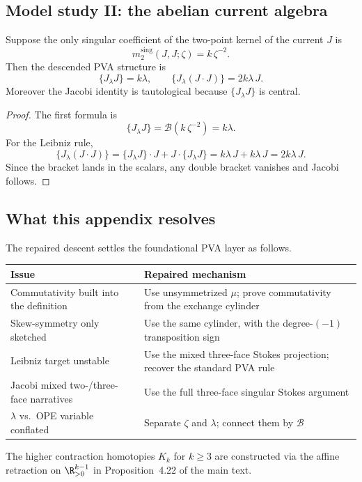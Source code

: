\subsection{Model study II: the abelian current algebra}

\begin{proposition}
\label{prop:abelian-study}
Suppose the only singular coefficient of the two-point kernel of the current $J$ is
\[
m_2^{\mathrm{sing}}(J,J;\zeta)=k\,\zeta^{-2}.
\]
Then the descended PVA structure is
\[
\{J_\lambda J\}=k\lambda,
\qquad
\{J_\lambda (J\cdot J)\}=2k\lambda\,J.
\]
Moreover the Jacobi identity is tautological because $\{J_\lambda J\}$ is central.
\end{proposition}

\begin{proof}
The first formula is
\[
\{J_\lambda J\}
=
\mathcal B(k\,\zeta^{-2})
=
k\lambda.
\]
For the Leibniz rule,
\[
\{J_\lambda(J\cdot J)\}
=
\{J_\lambda J\}\cdot J + J\cdot\{J_\lambda J\}
=
k\lambda\,J + k\lambda\,J
=
2k\lambda\,J.
\]
Since the bracket lands in the scalars, any double bracket vanishes and Jacobi follows.
\end{proof}

\subsection{What this appendix resolves}

\begin{summary}
\label{sum:pva-repair-ledger}
The repaired descent settles the foundational PVA layer as follows.

\begin{center}
\renewcommand{\arraystretch}{1.2}
\small
\begin{tabular}{@{}p{}|p{}@{}}
Issue & Repaired mechanism \\
\hline
Commutativity built into the definition & Use unsymmetrized $\mu$; prove commutativity from the exchange cylinder \\
Skew-symmetry only sketched & Use the same cylinder, with the degree-$(-1)$ transposition sign \\
Leibniz target unstable & Use the mixed three-face Stokes projection; recover the standard PVA rule \\
Jacobi mixed two-/three-face narratives & Use the full three-face singular Stokes argument \\
$\lambda$ vs.\ OPE variable conflated & Separate $\zeta$ and $\lambda$; connect them by $\mathcal B$
\end{tabular}
\end{center}

The higher contraction homotopies $K_k$ for $k\ge3$ are constructed via the affine retraction on $\R^{k-1}_{>0}$ in Proposition~4.22 of the main text.
\end{summary}

